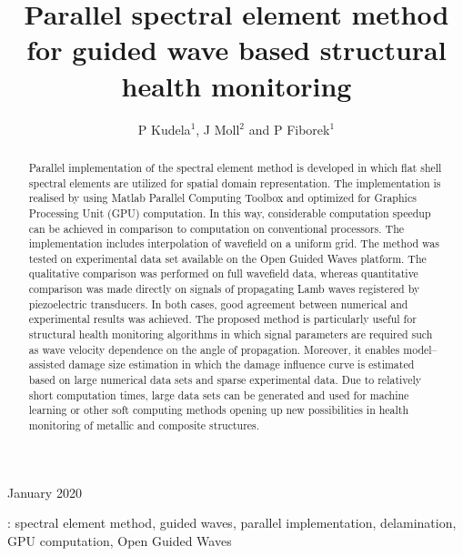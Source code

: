 \documentclass[12pt]{iopart}
\begin{document}
\title[Parallel spectral element method for SHM]{Parallel spectral element method for guided wave based structural health monitoring}

\author{P Kudela$^1$, J Moll$^2$ and P Fiborek$^1$}

\address{$^1$Institute of Fluid Flow Machinery, Polish Academy of Sciences, Poland}
\address{$^2$J.W. Goethe--University, Department of Physics, 60438 Frankfurt, Germany}

\vspace{10pt}
\begin{indented}
\item[]January 2020
\end{indented}

\begin{abstract}
Parallel implementation of the spectral element method is developed in which flat shell spectral elements are utilized for spatial domain representation. The implementation is realised by using Matlab Parallel Computing Toolbox and optimized for Graphics Processing Unit (GPU) computation. In this way, considerable computation speedup can be achieved in comparison to computation on conventional processors. The implementation includes interpolation of wavefield on a uniform grid. The method was tested on experimental data set available on the Open Guided Waves platform. The qualitative comparison was performed on full wavefield data, whereas quantitative comparison was made directly on signals of propagating Lamb waves registered by piezoelectric transducers. In both cases, good agreement between numerical and experimental results was achieved. The proposed method is particularly useful for structural health monitoring algorithms in which signal parameters are required such as wave velocity dependence on the angle of propagation. Moreover, it enables model--assisted damage size estimation in which the damage influence curve is estimated based on large numerical data sets and sparse experimental data. Due to relatively short computation times, large data sets can be generated and used for machine learning or other soft computing methods opening up new possibilities in health monitoring of metallic and composite structures.
\end{abstract}

%
\vspace{2pc}
: spectral element method, guided waves, parallel implementation, delamination, GPU computation, Open Guided Waves\\
\end{document}
